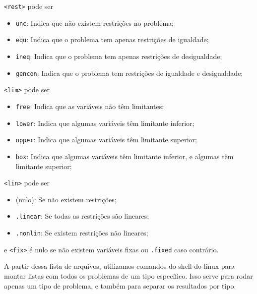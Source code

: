 \verb+<rest>+ pode ser
\begin{itemize}
  \item \verb+unc+: Indica que não existem restrições no problema;
  \item \verb+equ+: Indica que o problema tem apenas restrições de igualdade;
  \item \verb+ineq+: Indica que o problema tem apenas restrições de
    desigualdade;
  \item \verb+gencon+: Indica que o problema tem restrições de igualdade e
    desigualdade;
\end{itemize}
\verb+<lim>+ pode ser
\begin{itemize}
  \item \verb+free+: Indica que as variáveis não têm limitantes;
  \item \verb+lower+: Indica que algumas variáveis têm limitante inferior;
  \item \verb+upper+: Indica que algumas variáveis têm limitante superior;
  \item \verb+box+: Indica que algumas variáveis têm limitante inferior, e
    algumas têm limitante superior;
\end{itemize}
\verb+<lin>+ pode ser
\begin{itemize}
  \item (nulo): Se não existem restrições;
  \item \verb+.linear+: Se todas as restrições são lineares;
  \item \verb+.nonlin+: Se existem restrições não lineares;
\end{itemize}
e \verb+<fix>+ é nulo se não existem variáveis fixas ou \verb+.fixed+ caso contrário.

A partir dessa lista de arquivos, utilizamos comandos do shell do linux para montar listas
com todos os problemas de um tipo específico. Isso serve para rodar apenas um
tipo de problema, e também para separar os resultados por tipo.
